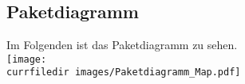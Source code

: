 \begin{samepage}
    \subsection{Paketdiagramm}\label{App_Map_Paketdiagramm}
    Im Folgenden ist das Paketdiagramm zu sehen.\\
    \texttt{[image: \\currfiledir images/Paketdiagramm\_Map.pdf]}
    
\end{samepage}
